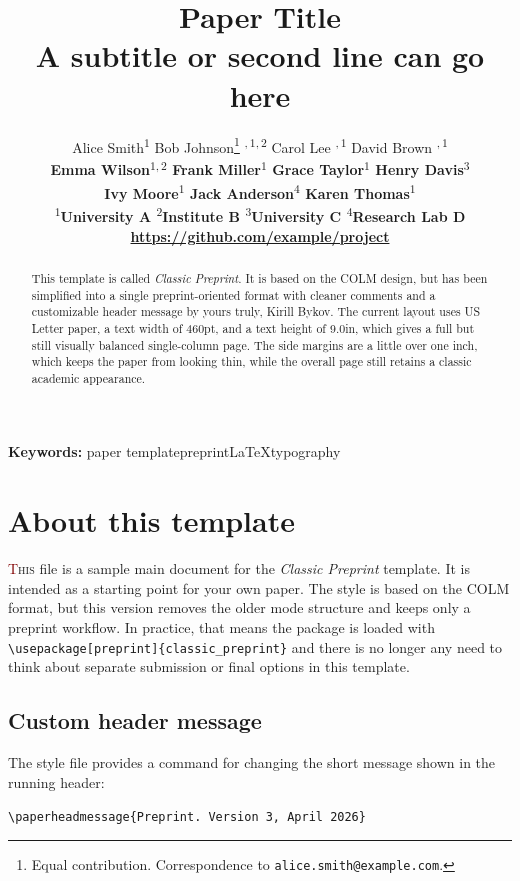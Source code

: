 \documentclass{article} %
\title{Paper Title\\
A subtitle or second line can go here}
\author{%
Alice Smith\textsuperscript{$1$} \; Bob Johnson\thanks{Equal contribution. Correspondence to \texttt{alice.smith@example.com}.}\,\,\textsuperscript{$,1,2$} \; Carol Lee\footnotemark[1]\,\,\textsuperscript{$,1$} \; David Brown\footnotemark[1]\,\,\textsuperscript{$,1$} \\\bfseries
Emma Wilson\textsuperscript{$1,2$} \; Frank Miller\textsuperscript{$1$} \; Grace Taylor\textsuperscript{$1$} \; Henry Davis\textsuperscript{$3$} \\\bfseries
Ivy Moore\textsuperscript{$1$} \; Jack Anderson\textsuperscript{$4$} \; Karen Thomas\textsuperscript{$1$} \\
\textsuperscript{$1$}University A \; \textsuperscript{$2$}Institute B \; \textsuperscript{$3$}University C \; \textsuperscript{$4$}Research Lab D
\\[2ex]
\url{https://github.com/example/project}
}
\newcommand*\initfamily{\usefont{U}{GoudyIn}{xl}{n}}
\newcommand{\kwsep}{\;\textbullet\;}
\newcommand{\keywords}[1]{%
  \par\noindent\textbf{Keywords: }#1
}
\begin{document}

\maketitle

\begin{abstract}
This template is called \emph{Classic Preprint}. It is based on the COLM design, but has been simplified into a single preprint-oriented format with cleaner comments and a customizable header message by yours truly, Kirill Bykov. The current layout uses US Letter
paper, a text width of 460pt, and a text height of 9.0in, which gives a full
but still visually balanced single-column page. The side margins are a little
over one inch, which keeps the paper from looking thin, while the overall page
still retains a classic academic appearance.
\end{abstract}

\keywords{paper template\kwsep preprint\kwsep LaTeX\kwsep typography}

\section{About this template}

\lettrine[lines=4]{\initfamily\textcolor{Maroon}{T}}{his} file is a sample
main document for the \emph{Classic Preprint} template. It is intended as a
starting point for your own paper. The style is based on the COLM format, but
this version removes the older mode structure and keeps only a preprint
workflow. In practice, that means the package is loaded with
\verb|\usepackage[preprint]{classic_preprint}| and there is no longer any need
to think about separate submission or final options in this template.

\subsection{Custom header message}

The style file provides a command for changing the short message shown in the
running header:

\begin{center}
\verb|\paperheadmessage{Preprint. Version 3, April 2026}|
\end{center}
\end{document}
